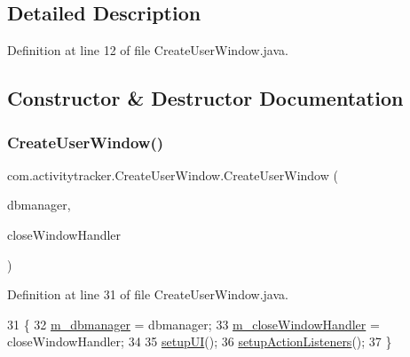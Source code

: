 \subsection{Detailed Description}


Definition at line 12 of file Create\+User\+Window.\+java.



\subsection{Constructor \& Destructor Documentation}
\mbox{\label{classcom_1_1activitytracker_1_1_create_user_window_ae7ace1ff93272b1f0ec6843856fa4222}} 
\subsubsection{\texorpdfstring{Create\+User\+Window()}{CreateUserWindow()}}
{\footnotesize\ttfamily com.\+activitytracker.\+Create\+User\+Window.\+Create\+User\+Window (\begin{DoxyParamCaption}\item[{\mbox{\hyperlink{classcom_1_1activitytracker_1_1_d_b_manager}{D\+B\+Manager}}}]{dbmanager,  }\item[{java.\+util.\+function.\+Consumer$<$ Void $>$}]{close\+Window\+Handler }\end{DoxyParamCaption})\hspace{0.3cm}{\ttfamily [package]}}



Definition at line 31 of file Create\+User\+Window.\+java.


\begin{DoxyCode}
31                                                                                                 \{
32         \mbox{\hyperlink{classcom_1_1activitytracker_1_1_create_user_window_adab0a80c7975dfad1c2882a56f00a235}{m\_dbmanager}} = dbmanager;
33         \mbox{\hyperlink{classcom_1_1activitytracker_1_1_create_user_window_a8fd1d7fb3c2f1913d2c44fd1d475a20a}{m\_closeWindowHandler}} = closeWindowHandler;
34 
35         \mbox{\hyperlink{classcom_1_1activitytracker_1_1_create_user_window_a41715d85194c6bb84cf6969f771940dc}{setupUI}}();
36         \mbox{\hyperlink{classcom_1_1activitytracker_1_1_create_user_window_a174a05a389ca6f3b7979ac9c5028a3ae}{setupActionListeners}}();
37     \}
\end{DoxyCode}


